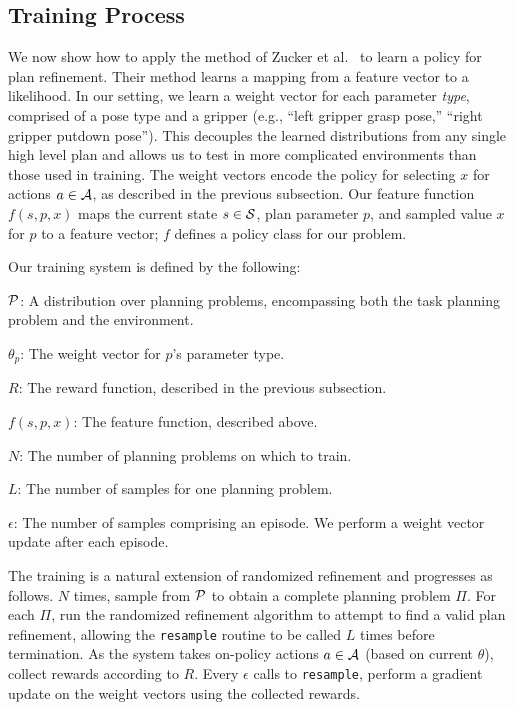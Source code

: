 \subsection{Training Process}
We now show how to apply the method of Zucker et al.~\cite{workspacebias} to learn a policy
for plan refinement. Their method learns a mapping from a feature vector to a
likelihood. In our setting, we learn a weight vector for each parameter
\emph{type}, comprised of a pose type and a gripper (e.g., ``left gripper grasp pose,'' ``right
gripper putdown pose''). This decouples the learned distributions from any single
high level plan and allows us to test in more complicated environments than those used in
training. The weight vectors encode the policy for selecting $x$ for actions $a \in \mathcal{A}$,
as described in the previous subsection. Our feature function $f(s, p, x)$ maps the current
state $s \in \mathcal{S}$, plan parameter $p$, and sampled value $x$ for $p$ to a feature vector; $f$
defines a policy class for our problem.

Our training system is defined by the following:
\begin{tightlist}
\item[$\mathcal{P}$:] A distribution over planning problems, encompassing both
the task planning problem and the environment.
\item[$\theta_{p}$:] The weight vector for $p$'s parameter type.
\item[$R$:] The reward function, described in the previous subsection.
\item[$f(s, p, x)$:] The feature function, described above.
\item[$N$:] The number of planning problems on which to train.
\item[$L$:] The number of samples for one planning problem.
\item[$\epsilon$:] The number of samples comprising an episode. We perform
a weight vector update after each episode.
\end{tightlist}

The training is a natural extension of randomized
refinement and progresses as follows. $N$ times, sample from $\mathcal{P}$ to obtain
a complete planning problem $\Pi$. For each $\Pi$, run the randomized refinement
algorithm to attempt to find a valid plan refinement, allowing the \texttt{resample}
routine to be called $L$ times before termination. As the system takes on-policy actions $a \in \mathcal{A}$ (based on
current $\theta$), collect rewards according to $R$. Every $\epsilon$ calls to
\texttt{resample}, perform a gradient update on the weight vectors using the
collected rewards.

